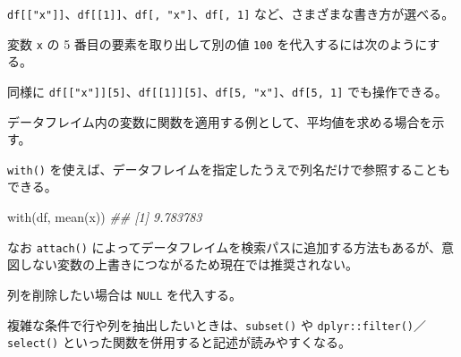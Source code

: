 \documentclass[
  letterpaper,
  xelatex,
  ja=standard, xelatex]{bxjsbook}
\newenvironment{Shaded}{\begin{snugshade}}{\end{snugshade}}
\newcommand{\ConstantTok}[1]{\textcolor[rgb]{0.56,0.35,0.01}{#1}}
\newcommand{\DecValTok}[1]{\textcolor[rgb]{0.68,0.00,0.00}{#1}}
\newcommand{\DocumentationTok}[1]{\textcolor[rgb]{0.37,0.37,0.37}{\textit{#1}}}
\newcommand{\FunctionTok}[1]{\textcolor[rgb]{0.28,0.35,0.67}{#1}}
\newcommand{\NormalTok}[1]{\textcolor[rgb]{0.00,0.23,0.31}{#1}}
\newcommand{\OtherTok}[1]{\textcolor[rgb]{0.00,0.23,0.31}{#1}}
\newcommand{\SpecialCharTok}[1]{\textcolor[rgb]{0.37,0.37,0.37}{#1}}
\begin{document}
\texttt{df{[}{[}"x"{]}{]}}、\texttt{df{[}{[}1{]}{]}}、\texttt{df{[},\ "x"{]}}、\texttt{df{[},\ 1{]}}
など、さまざまな書き方が選べる。

変数 \texttt{x} の 5 番目の要素を取り出して別の値 \texttt{100}
を代入するには次のようにする。

\begin{Shaded}
\end{Shaded}

同様に
\texttt{df{[}{[}"x"{]}{]}{[}5{]}}、\texttt{df{[}{[}1{]}{]}{[}5{]}}、\texttt{df{[}5,\ "x"{]}}、\texttt{df{[}5,\ 1{]}}
でも操作できる。

データフレイム内の変数に関数を適用する例として、平均値を求める場合を示す。

\begin{Shaded}
\end{Shaded}

\texttt{with()}
を使えば、データフレイムを指定したうえで列名だけで参照することもできる。

\begin{Shaded}
\begin{Highlighting}[]
\FunctionTok{with}\NormalTok{(df, }\FunctionTok{mean}\NormalTok{(x))}
\DocumentationTok{\#\# [1] 9.783783}
\end{Highlighting}
\end{Shaded}

なお \texttt{attach()}
によってデータフレイムを検索パスに追加する方法もあるが、意図しない変数の上書きにつながるため現在では推奨されない。

列を削除したい場合は \texttt{NULL} を代入する。

\begin{Shaded}
\end{Shaded}

複雑な条件で行や列を抽出したいときは、\texttt{subset()} や
\texttt{dplyr::filter()}／\texttt{select()}
といった関数を併用すると記述が読みやすくなる。
\end{document}
